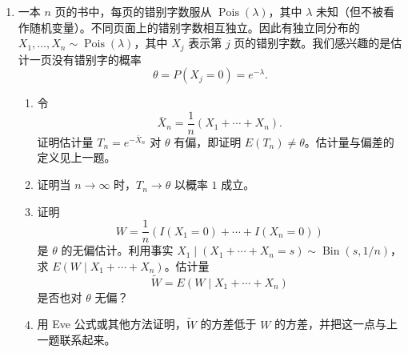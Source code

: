 \documentclass[UTF8,12pt,a4paper,fontset=fandol]{ctexart}
\begin{document}
\begin{enumerate}
  一种改进 $T_1$ 的策略如下。假设存在随机变量 $R$，使得 $T_2=E(T_1\mid R)$ 是 $X_1,\ldots,X_n$ 的函数（一般地，$E(T_1\mid R)$ 可能涉及未知量如 $\theta$，那样就不能作为估计量）。还假设 $P(T_1=T_2)<1$，且 $E(T_1^2)$ 有限。
  \begin{enumerate}
    \item 用 Jensen 不等式证明，$T_2$ 比 $T_1$ 更好，意义是均方误差更小：
    \[
      E(T_2-\theta)^2<E(T_1-\theta)^2.
    \]
    提示：对右端使用 Adam 公式。
    \item 估计量 $T$ 对 $\theta$ 的\textbf{偏差}定义为 $b(T)=E(T)-\theta$。统计中的一个重要恒等式，即\textbf{偏差--方差权衡}的一种形式，说均方误差等于方差加偏差平方：
    \[
      E(T-\theta)^2=\operatorname{Var}(T)+(b(T))^2.
    \]
    使用这个恒等式和 Eve 公式，给出 (a) 结论的另一种证明。
    \item 现在假设 $X_1,X_2,\ldots$ 独立同分布，均值为 $\theta$，并考虑特殊情形
    \[
      T_1=X_1,\qquad R=\sum_{j=1}^n X_j.
    \]
    求 $T_2$ 的简化形式，并检查当 $n\ge 2$ 时它的均方误差低于 $T_1$。还要说明当 $n\to\infty$ 时，$T_1$ 与 $T_2$ 分别会怎样。
  \end{enumerate}

  \item 一本 $n$ 页的书中，每页的错别字数服从 $\operatorname{Pois}(\lambda)$，其中 $\lambda$ 未知（但不被看作随机变量）。不同页面上的错别字数相互独立。因此有独立同分布的 $X_1,\ldots,X_n\sim\operatorname{Pois}(\lambda)$，其中 $X_j$ 表示第 $j$ 页的错别字数。我们感兴趣的是估计一页没有错别字的概率
  \[
    \theta=P(X_j=0)=e^{-\lambda}.
  \]
  \begin{enumerate}
    \item 令
    \[
      \bar X_n=\frac1n(X_1+\cdots+X_n).
    \]
    证明估计量 $T_n=e^{-\bar X_n}$ 对 $\theta$ 有偏，即证明 $E(T_n)\ne\theta$。估计量与偏差的定义见上一题。
    \item 证明当 $n\to\infty$ 时，$T_n\to\theta$ 以概率 $1$ 成立。
    \item 证明
    \[
      W=\frac1n(I(X_1=0)+\cdots+I(X_n=0))
    \]
    是 $\theta$ 的无偏估计。利用事实 $X_1\mid(X_1+\cdots+X_n=s)\sim\operatorname{Bin}(s,1/n)$，求 $E(W\mid X_1+\cdots+X_n)$。估计量
    \[
      \widetilde W=E(W\mid X_1+\cdots+X_n)
    \]
    是否也对 $\theta$ 无偏？
    \item 用 Eve 公式或其他方法证明，$\widetilde W$ 的方差低于 $W$ 的方差，并把这一点与上一题联系起来。
  \end{enumerate}


\end{enumerate}
\end{document}
